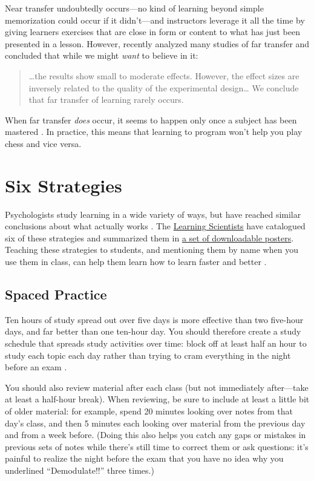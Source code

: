 Near transfer undoubtedly occurs---no kind of learning beyond simple
memorization could occur if it didn't---and instructors leverage it
all the time by giving learners exercises that are close in form or
content to what has just been presented in a lesson.  However,
\cite{Sala2017} recently analyzed many studies of far transfer and
concluded that while we might \emph{want} to believe in it:

\begin{quote}

  {\ldots}the results show small to moderate effects. However, the
  effect sizes are inversely related to the quality of the
  experimental design{\ldots} We conclude that far transfer of
  learning rarely occurs.

\end{quote}

When far transfer \emph{does} occur, it seems to happen only once a
subject has been mastered \cite{Gick1987}.  In practice, this means
that learning to program won't help you play chess and vice versa.

\section{Six Strategies}\label{s:individual-strategies}

Psychologists study learning in a wide variety of ways, but have
reached similar conclusions about what actually works \cite{Mark2018}.
The \href{http://www.learningscientists.org/}{Learning Scientists}
have catalogued six of these strategies and summarized them in
\href{http://www.learningscientists.org/downloadable-materials}{a set
  of downloadable posters}.  Teaching these strategies to students,
and mentioning them by name when you use them in class, can help them
learn how to learn faster and better \cite{Wein2018}.

\subsection*{Spaced Practice}

Ten hours of study spread out over five days is more effective than
two five-hour days, and far better than one ten-hour day.  You should
therefore create a study schedule that spreads study activities over
time: block off at least half an hour to study each topic each day
rather than trying to cram everything in the night before an exam
\cite{Kang2016}.

You should also review material after each class (but not immediately
after---take at least a half-hour break).  When reviewing, be sure to
include at least a little bit of older material: for example, spend 20
minutes looking over notes from that day's class, and then 5 minutes
each looking over material from the previous day and from a week
before.  (Doing this also helps you catch any gaps or mistakes in
previous sets of notes while there's still time to correct them or ask
questions: it's painful to realize the night before the exam that you
have no idea why you underlined ``Demodulate!!'' three times.)

